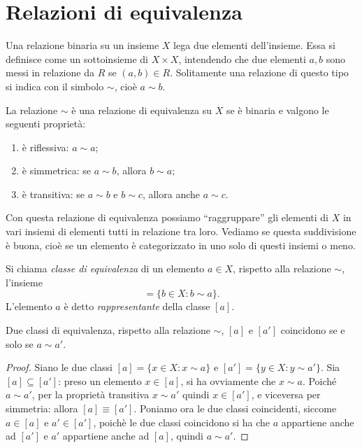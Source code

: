 \section{Relazioni di equivalenza} \label{sec:relazioni-equivalenza}
Una relazione binaria su un insieme $X$ lega due elementi dell'insieme.
Essa si definisce come un sottoinsieme di $X\times X$, intendendo che due elementi $a,b$ sono messi in relazione da $R$ se $(a,b)\in R$.
Solitamente una relazione di questo tipo si indica con il simbolo $\sim$, cioè $a\sim b$.
\begin{definizione} \label{d:relazione-equivalenza}
	La relazione $\sim$ è una relazione di equivalenza su $X$ se è binaria e valgono le seguenti proprietà:
	\begin{enumerate}
		\item è riflessiva: $a\sim a$;
		\item è simmetrica: se $a\sim b$, allora $b\sim a$;
		\item è transitiva: se $a\sim b$ e $b\sim c$, allora anche $a\sim c$.
	\end{enumerate}
\end{definizione}
Con questa relazione di equivalenza possiamo ``raggruppare'' gli elementi di $X$ in vari insiemi di elementi tutti in relazione tra loro.
Vediamo se questa suddivisione è buona, cioè se un elemento è categorizzato in uno solo di questi insiemi o meno.
\begin{definizione}
	Si chiama \emph{classe di equivalenza} di un elemento $a\in X$, rispetto alla relazione $\sim$, l'insieme
	\begin{equation*}
		[a]=\{b\in X\colon b\sim a\}.
	\end{equation*}
	L'elemento $a$ è detto \emph{rappresentante} della classe $[a]$.
\end{definizione}
\begin{teorema}
	Due classi di equivalenza, rispetto alla relazione $\sim$, $[a]$ e $[a']$ coincidono se e solo se $a\sim a'$.
\end{teorema}
\begin{proof}
	Siano le due classi $[a]=\{x\in X\colon x\sim a\}$ e $[a']=\{y\in X\colon y\sim a'\}$.
	Sia $[a]\subseteq[a']$: preso un elemento $x\in[a]$, si ha ovviamente che $x\sim a$.
	Poiché $a\sim a'$, per la proprietà transitiva $x\sim a'$ quindi $x\in[a']$, e viceversa per simmetria: allora $[a]\equiv[a']$.
	Poniamo ora le due classi coincidenti, siccome $a\in[a]$ e $a'\in[a']$, poichè le due classi coincidono si ha che $a$ appartiene anche ad $[a']$ e $a'$ appartiene anche ad $[a]$, quindi $a\sim a'$.
\end{proof}

